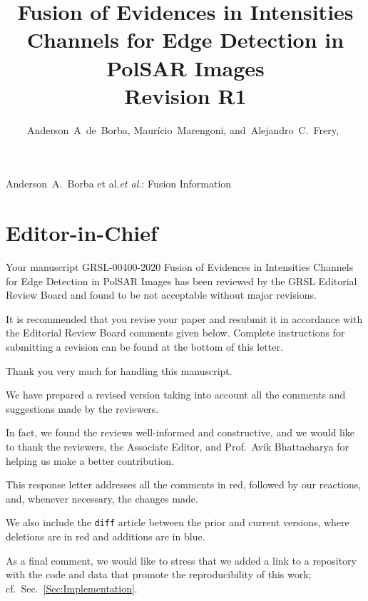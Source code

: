\documentclass[journal,onecolumn,draftcls,11pt]{IEEEtran}
\begin{document}
\title{Fusion of Evidences in Intensities Channels for Edge Detection in PolSAR Images\\
	Revision R1}

\author{Anderson~A~de~Borba,
	Maurício~Marengoni,
	and~Alejandro~C.~Frery,~}

%
{Anderson~A.\ Borba et al.\MakeLowercase{\textit{et al.}}: Fusion Information}

\maketitle

\IEEEpeerreviewmaketitle

\section{Editor-in-Chief}
\begin{tcolorbox}[colback=red!5!white,colframe=red!75!black,title=Comment \#1]
Your manuscript GRSL-00400-2020 Fusion of Evidences in Intensities Channels for Edge Detection in PolSAR Images has been reviewed by the GRSL  Editorial Review Board and found to be not acceptable without  major revisions.

It is recommended that you revise your paper and resubmit it in  accordance with the Editorial Review Board comments given below.   Complete instructions for submitting a revision can be found at the bottom of this letter.
\end{tcolorbox}

Thank you very much for handling this manuscript.

We have prepared a revised version taking into account all the comments and suggestions made by the reviewers.

In fact, we found the reviews well-informed and constructive, and we would like to thank the reviewers, the Associate Editor, and Prof.\ Avik Bhattacharya for helping us make a better contribution.

This response letter addresses all the comments in red, followed by
our reactions, and, whenever necessary, the changes made.

We also include the \texttt{diff} article between the prior and current versions, where deletions are in red and additions are in blue.

As a final comment, we would like to stress that we added a link to a repository with the code and data that promote the reproducibility of this work; cf.\ Sec.~\ref{Sec:Implementation}.
\end{document}
